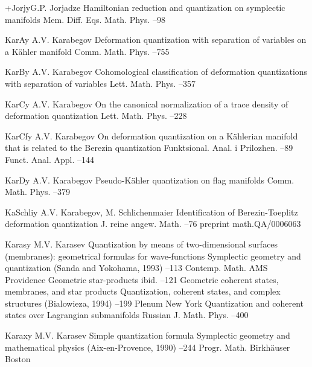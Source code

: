 \documentclass[12pt]{amsart}
\numberwithin{equation}{section}
\theoremstyle{remark}
\newcommand{\by}{\mathbf y}
\begin{document}
\begin{thebibliography}{199}
 +Jorj\by{G.P. Jorjadze \paper Hamiltonian reduction and quantization on
symplectic manifolds \jour Mem. Diff. Eqs. Math. Phys.  
--98}

 KarA\by{ A.V. Karabegov \paper Deformation quantization with separation
of variables on a K\"ahler manifold \jour Comm. Math. Phys.  
--755}

 KarB\by{ A.V. Karabegov \paper Cohomological classification of
deformation quantizations with separation of variables \jour Lett. Math. Phys.
  --357}

 KarC\by{ A.V. Karabegov \paper On the canonical normalization of a trace
density of deformation quantization \jour Lett. Math. Phys.  
--228}

 KarCf\by{ A.V. Karabegov \paper On deformation quantization on a
K\"ahlerian manifold that is related to the Berezin quantization \jour
Funktsional. Anal. i Prilozhen.   --89 \transl
Funct. Anal. Appl.   --144}

 KarD\by{ A.V. Karabegov \paper Pseudo-K\"ahler quantization on flag
manifolds \jour Comm. Math. Phys.   --379}

 KaSchli\by{ A.V. Karabegov, M. Schlichenmaier \paper Identification of
Berezin-Toeplitz deformation quantization \jour J. reine angew. Math. 
 --76 \paperinfo preprint math.QA/0006063}

 Karas\by{ M.V. Karasev \paper Quantization by means of two-dimensional
surfaces (membranes): geometrical formulas for wave-functions \inbook
Symplectic geometry and quantization (Sanda and Yokohama, 1993) --113
\bookinfo Contemp. Math.  \publ AMS \publaddr Providence 
\moreref \paper Geometric star-products \inbook ibid. --121 \moreref
\paper Geometric coherent states, membranes, and star products \inbook
Quantization, coherent states, and complex structures (Bialowieza, 1994) --199 \publ Plenum \publaddr New York  \moreref \paper Quantization
and coherent states over Lagrangian submanifolds \jour Russian J. Math. Phys.
  --400}

 Karax\by{ M.V. Karasev \paper Simple quantization formula \inbook
Symplectic geometry and mathematical physics (Aix-en-Provence, 1990) --244 \bookinfo Progr. Math.  \publ Birkh\"auser \publaddr Boston
}


\end{thebibliography}
\end{document}
